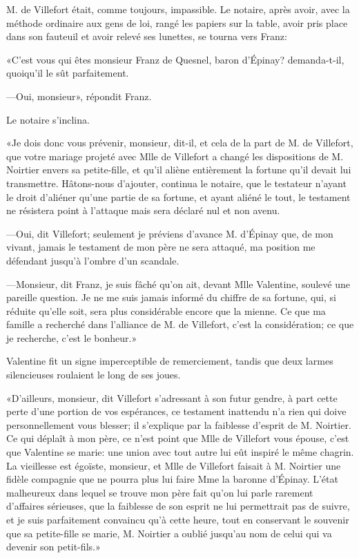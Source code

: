 M. de Villefort était, comme toujours, impassible. Le notaire, après avoir, avec la méthode ordinaire aux gens de loi, rangé les papiers sur la table, avoir pris place dans son fauteuil et avoir relevé ses lunettes, se tourna vers Franz: 

«C'est vous qui êtes monsieur Franz de Quesnel, baron d'Épinay? demanda-t-il, quoiqu'il le sût parfaitement. 

—Oui, monsieur», répondit Franz. 

Le notaire s'inclina. 

«Je dois donc vous prévenir, monsieur, dit-il, et cela de la part de M. de Villefort, que votre mariage projeté avec Mlle de Villefort a changé les dispositions de M. Noirtier envers sa petite-fille, et qu'il aliène entièrement la fortune qu'il devait lui transmettre. Hâtons-nous d'ajouter, continua le notaire, que le testateur n'ayant le droit d'aliéner qu'une partie de sa fortune, et ayant aliéné le tout, le testament ne résistera point à l'attaque mais sera déclaré nul et non avenu. 

—Oui, dit Villefort; seulement je préviens d'avance M. d'Épinay que, de mon vivant, jamais le testament de mon père ne sera attaqué, ma position me défendant jusqu'à l'ombre d'un scandale. 

—Monsieur, dit Franz, je suis fâché qu'on ait, devant Mlle Valentine, soulevé une pareille question. Je ne me suis jamais informé du chiffre de sa fortune, qui, si réduite qu'elle soit, sera plus considérable encore que la mienne. Ce que ma famille a recherché dans l'alliance de M. de Villefort, c'est la considération; ce que je recherche, c'est le bonheur.» 

Valentine fit un signe imperceptible de remerciement, tandis que deux larmes silencieuses roulaient le long de ses joues. 

«D'ailleurs, monsieur, dit Villefort s'adressant à son futur gendre, à part cette perte d'une portion de vos espérances, ce testament inattendu n'a rien qui doive personnellement vous blesser; il s'explique par la faiblesse d'esprit de M. Noirtier. Ce qui déplaît à mon père, ce n'est point que Mlle de Villefort vous épouse, c'est que Valentine se marie: une union avec tout autre lui eût inspiré le même chagrin. La vieillesse est égoïste, monsieur, et Mlle de Villefort faisait à M. Noirtier une fidèle compagnie que ne pourra plus lui faire Mme la baronne d'Épinay. L'état malheureux dans lequel se trouve mon père fait qu'on lui parle rarement d'affaires sérieuses, que la faiblesse de son esprit ne lui permettrait pas de suivre, et je suis parfaitement convaincu qu'à cette heure, tout en conservant le souvenir que sa petite-fille se marie, M. Noirtier a oublié jusqu'au nom de celui qui va devenir son petit-fils.» 


